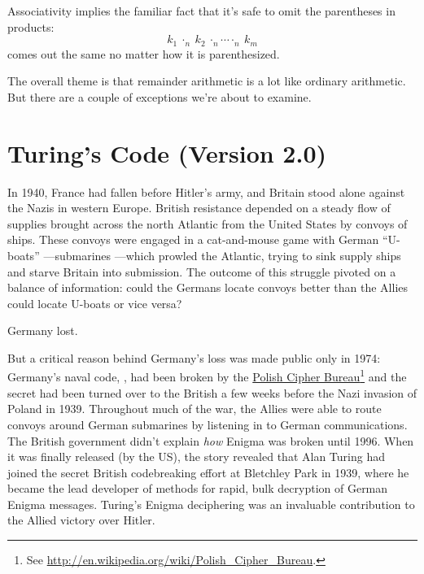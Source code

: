 Associativity implies the familiar fact that it's safe to omit the
parentheses in products:
\[
k_1\ \cdot_n\ k_2\ \cdot_n \cdots \cdot_n\ k_m
\]
comes out the same no matter how it is parenthesized.

The overall theme is that remainder arithmetic is a lot like ordinary
arithmetic.  But there are a couple of exceptions we're about to
examine.

\begin{problems}
\practiceproblems
{}

\homeworkproblems
{}

\classproblems
{}

\examproblems
{}
\end{problems}

\section{Turing's Code (Version 2.0)}

In 1940, France had fallen before Hitler's army, and Britain stood
alone against the Nazis in western Europe.  British resistance
depended on a steady flow of supplies brought across the north
Atlantic from the United States by convoys of ships.  These convoys
were engaged in a cat-and-mouse game with German ``U-boats''
---submarines ---which prowled the Atlantic, trying to sink supply
ships and starve Britain into submission.  The outcome of this
struggle pivoted on a balance of information: could the Germans locate
convoys better than the Allies could locate U-boats or vice versa?

Germany lost.

But a critical reason behind Germany's loss was made public only in
1974: Germany's naval code, , had been broken by the
\href{http://en.wikipedia.org/wiki/Polish_Cipher_Bureau}{Polish Cipher
  Bureau}\footnote{See
  \url{http://en.wikipedia.org/wiki/Polish\_Cipher\_Bureau}.} and the
secret had been turned over to the British a few weeks before the Nazi
invasion of Poland in 1939.  Throughout much of the war, the Allies
were able to route convoys around German submarines by listening in to
German communications.  The British government didn't explain
\emph{how} Enigma was broken until 1996.  When it was finally released
(by the US), the story revealed that Alan Turing had joined the secret
British codebreaking effort at Bletchley Park in 1939, where he became
the lead developer of methods for rapid, bulk decryption of German
Enigma messages.  Turing's Enigma deciphering was an invaluable
contribution to the Allied victory over Hitler.

